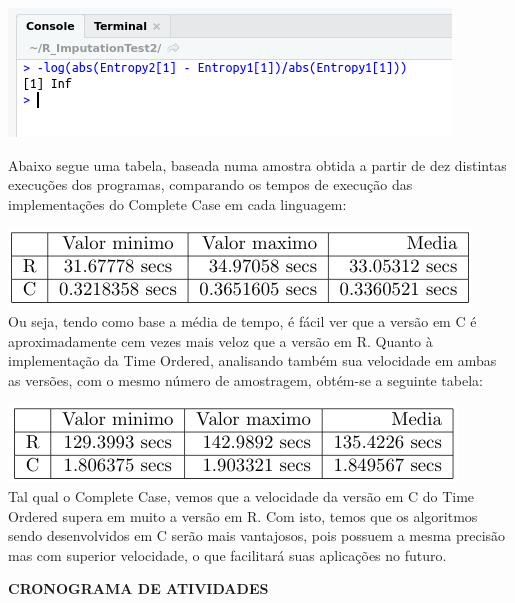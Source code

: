 \documentclass{article}
\begin{document}
\includegraphics[width=0.80\columnwidth]{Code.png}

Abaixo segue uma tabela, baseada numa amostra obtida a partir de dez distintas execuções dos programas, comparando os tempos de execução das implementações do Complete Case em cada linguagem:

\includegraphics[width=0.80\columnwidth]{RxCtable1.png}\\

Ou seja, tendo como base a média de tempo, é fácil ver que a versão em C é aproximadamente cem vezes mais veloz que a versão em R.
Quanto à implementação da Time Ordered, analisando também sua velocidade em ambas as versões, com o mesmo número de amostragem, obtém-se a seguinte tabela:

\includegraphics[width=0.80\columnwidth]{RxCtable2.png}\\

Tal qual o Complete Case, vemos que a velocidade da versão em C do Time Ordered supera em muito a versão em R.
Com isto, temos que os algoritmos sendo desenvolvidos em C serão mais vantajosos, pois possuem a mesma precisão mas com superior velocidade, o que facilitará suas aplicações no futuro.

\newpage
\begin{center}
\textbf{\large{CRONOGRAMA DE ATIVIDADES}}

\hrulefill 

\end{center}
\end{document}
